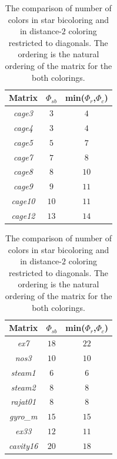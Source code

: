 \documentclass[12pt, twoside,a4paper,toc=bibliography]{scrbook}
\begin{document}
\begin{table}
\centering
\begin{tabular}{|c|c|c|}
\hline
Matrix & $\Phi_{sb}$ & min($\Phi_r$,$\Phi_c$)\\\hline
\textit{cage3} & $3$ & $4$\\\hline
\textit{cage4} & $3$ & $4$ \\\hline
\textit{cage5} & $5$ & $7$\\\hline
\textit{cage7} & $7$  & $8$\\\hline
\textit{cage8} & $8$  & $10$\\\hline
\textit{cage9} & $9$  & $11$\\\hline
\textit{cage10} & $10$ & $11$\\\hline
\textit{cage12} & $13$ &  $14$\\\hline
\end{tabular}
\hfill
\begin{tabular}{|c|c|c|}
\hline
Matrix & $\Phi_{sb}$ & min($\Phi_r$,$\Phi_c$)\\\hline
\textit{ex7} & $18$ & $22$ \\\hline
\textit{nos3} & $10$ & $10$ \\\hline
\textit{steam1} & $6$ & $6$ \\\hline
\textit{steam2} & $8$ & $8$ \\\hline
\textit{rajat01} & $8$ & $8$ \\\hline
\textit{gyro\_m} & $15$ & $15$\\\hline
\textit{ex33} & $12$ & $11$\\\hline
\textit{cavity16} & $20$ & $18$ \\\hline
\end{tabular}

\caption{The comparison of number of colors in star bicoloring and in
distance-$2$ coloring restricted to diagonals.
The ordering is the natural ordering of the matrix for the both colorings.
}
\label{table.starbic.d2.diag}
\end{table}
\end{document}
